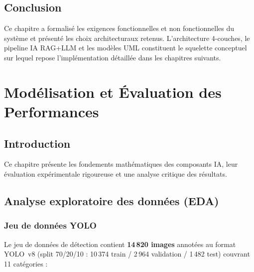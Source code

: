\documentclass[12pt,a4paper,twoside]{report}
\newcounter{hi}
\begin{document}
\section*{Conclusion}
Ce chapitre a formalisé les exigences fonctionnelles et non fonctionnelles
du système et présenté les choix architecturaux retenus. L'architecture
4-couches, le pipeline IA RAG+LLM et les modèles UML constituent le
squelette conceptuel sur lequel repose l'implémentation détaillée dans les
chapitres suivants.

\chapter{Modélisation et Évaluation des Performances}
\section*{Introduction}
Ce chapitre présente les fondements mathématiques des composants IA,
leur évaluation expérimentale rigoureuse et une analyse critique des
résultats.

\section{Analyse exploratoire des données (EDA)}

\subsection{Jeu de données YOLO}
Le jeu de données de détection contient \textbf{14\,820 images} annotées au
format YOLO~v8 (split 70/20/10 : 10\,374 train / 2\,964 validation / 1\,482 test)
couvrant 11 catégories :
\end{document}
